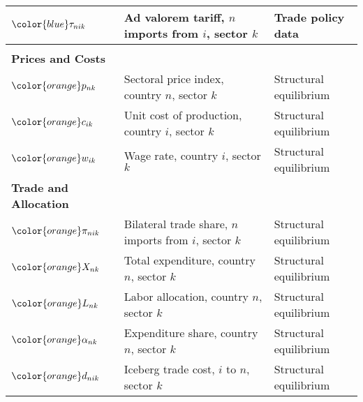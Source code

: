\begin{table}[H]
\begin{tabular}{>{\raggedright}p{3cm} >{\raggedright}p{6cm} >{\raggedright\arraybackslash}p{5cm}}
\midrule
${\color{blue}\tau_{nik}}$ & Ad valorem tariff, $n$ imports from $i$, sector $k$ & Trade policy data \\
\midrule
\multicolumn{3}{l}{\textbf{\large Endogenous Variables}} \\
\midrule
\textbf{Prices and Costs} & & \\
${\color{orange}p_{nk}}$ & Sectoral price index, country $n$, sector $k$ & Structural equilibrium \\
${\color{orange}c_{ik}}$ & Unit cost of production, country $i$, sector $k$ & Structural equilibrium \\
${\color{orange}w_{ik}}$ & Wage rate, country $i$, sector $k$ & Structural equilibrium \\
\addlinespace[0.3em]
\textbf{Trade and Allocation} & & \\
${\color{orange}\pi_{nik}}$ & Bilateral trade share, $n$ imports from $i$, sector $k$ & Structural equilibrium \\
${\color{orange}X_{nk}}$ & Total expenditure, country $n$, sector $k$ & Structural equilibrium \\
${\color{orange}L_{nk}}$ & Labor allocation, country $n$, sector $k$ & Structural equilibrium \\
${\color{orange}\alpha_{nk}}$ & Expenditure share, country $n$, sector $k$ & Structural equilibrium \\
${\color{orange}d_{nik}}$ & Iceberg trade cost, $i$ to $n$, sector $k$ & Structural equilibrium \\
\bottomrule
\end{tabular}
\end{table}
